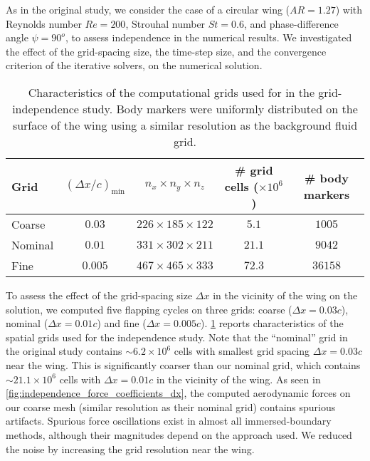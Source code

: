 As in the original study, we consider the case of a circular wing ($AR = 1.27$) with Reynolds number $Re = 200$, Strouhal number $St = 0.6$, and phase-difference angle $\psi = 90^o$, to assess independence in the numerical results.
We investigated the effect of the grid-spacing size, the time-step size, and the convergence criterion of the iterative solvers, on the numerical solution.

\begin{table}[!h]
  \centering
  \begin{tabular}{lcccc}
    \hline\hline
    Grid & $(\Delta x / c)_\text{min}$ & $n_x \times n_y \times n_z$ & \# grid cells ($\times 10^6$) & \# body markers \\
    \hline
    Coarse & $0.03$ & $226 \times 185 \times 122$ & $5.1$ & $1005$ \\
    Nominal & $0.01$ & $331 \times 302 \times 211$ & $21.1$ & $9042$ \\
    Fine & $0.005$ & $467 \times 465 \times 333$ & $72.3$ & $36158$ \\
    \hline\hline
  \end{tabular}
  \caption{Characteristics of the computational grids used for in the grid-independence study. Body markers were uniformly distributed on the surface of the wing using a similar resolution as the background fluid grid.}
  \label{tab:independence_grid_charateristics}
\end{table}

To assess the effect of the grid-spacing size $\Delta x$ in the vicinity of the wing on the solution, we computed five flapping cycles on three grids: coarse ($\Delta x = 0.03c$), nominal ($\Delta x = 0.01c$) and fine ($\Delta x = 0.005c$).
\cref{tab:independence_grid_charateristics} reports characteristics of the spatial grids used for the independence study.
Note that the ``nominal'' grid in the original study contains $\sim 6.2 \times 10^6$ cells with smallest grid spacing $\Delta x = 0.03c$ near the wing.
This is significantly coarser than our nominal grid, which contains $\sim 21.1 \times 10^6$ cells with $\Delta x = 0.01c$ in the vicinity of the wing.
As seen in \cref{fig:independence_force_coefficients_dx}, the computed aerodynamic forces on our coarse mesh (similar resolution as their nominal grid) contains spurious artifacts.
Spurious force oscillations exist in almost all immersed-boundary methods, although their magnitudes depend on the approach used.
We reduced the noise by increasing the grid resolution near the wing.

